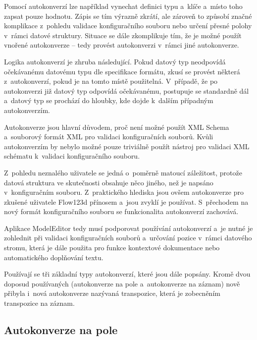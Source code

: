 \documentclass[FM,bw,DP]{tulthesis}
\begin{document}
Pomocí autokonverzí lze například vynechat definici typu a~klíče a~místo toho zapsat pouze hodnotu. Zápis se tím výrazně zkrátí, ale zároveň to způsobí značné komplikace z~pohledu validace konfiguračního souboru nebo určení přesné polohy v~rámci datové struktury. Situace se dále zkomplikuje tím, že je možné použít vnořené autokonverze -- tedy provést autokonverzi v~rámci jiné autokonverze.

Logika autokonverzí je zhruba následující. Pokud datový typ neodpovídá očekávanému datovému typu dle specifikace formátu, zkusí se provést některá z~autokonverzí, pokud je na tomto místě použitelná. V~případě, že po autokonverzi již datový typ odpovídá očekávanému, postupuje se standardně dál a~datový typ se prochází do hloubky, kde dojde k~dalším případným autokonverzím.

Autokonverze jsou hlavní důvodem, proč není možné použít XML Schema a~souborový formát XML pro validaci konfiguračních souborů. Kvůli autokonverzím by nebylo možné pouze triviálně použít nástroj pro validaci XML schématu k~validaci konfiguračního souboru.

Z~pohledu neznalého uživatele se jedná o~poměrně matoucí záležitost, protože datová struktura ve skutečnosti obsahuje něco jiného, než je napsáno v~konfiguračním souboru. Z~praktického hlediska jsou ovšem autokonverze pro zkušené uživatele Flow123d přínosem a~jsou zvyklí je používat. S~přechodem na nový formát konfiguračního souboru se funkcionalita autokonverzí zachovává.

Aplikace ModelEditor tedy musí podporovat používání autokonverzí a~je nutné je zohlednit při validaci konfiguračních souborů a~určování pozice v~rámci datového stromu, která je dále použita pro funkce kontextové dokumentace nebo automatického doplňování textu. 

Používají se tři základní typy autokonverzí, které jsou dále popsány. Kromě dvou doposud používaných (autokonverze na pole a~autokonverze na záznam) nově přibyla i~nová autokonverze nazývaná transpozice, která je zobecněním transpozice na záznam.

\subsection{Autokonverze na pole}

\lstset{style=short}

\end{document}
